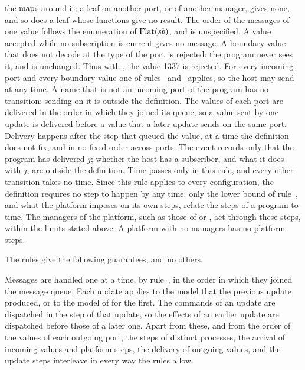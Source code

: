 \begin{rulecomments}
the $\mathrm{map}$s around it; a leaf on another port, or of another manager,
gives none, and so does a leaf whose functions give no result. The order of
the messages of one value follows the enumeration of $\mathrm{Flat}(\mathit{sb})$, and
is unspecified. A value accepted while no subscription is current gives no
message. %
 A boundary value that does not decode at the type of the
port is rejected: the program never sees it, and is unchanged. %
Thus with , the value 1337 is
rejected. For every incoming port and every boundary value one of
rules~ and~ applies, so the host
may send at any time. A name that is not an incoming port of the program has
no transition: sending on it is outside the definition.
 The values of each port are delivered in the order in
which they joined its queue, so a value sent by one update is delivered
before a value that a later update sends on the same port. Delivery happens
after the step that queued the value, at a time the definition does not fix,
and in no fixed order across ports. The event records only that the program
has delivered $j$; whether the host has a subscriber, and what it does with
$j$, are outside the definition. %
 Time passes only in this rule, and every other transition
takes no time. Since this rule applies to every configuration, the definition
requires no step to happen by any time: only the lower bound of
rule~, and what the platform imposes on its own
steps, relate the steps of a program to time.
 The managers of the platform, such as those of
 or , act through these steps, within the limits stated
above. A platform with no managers has no platform steps. %
\end{rulecomments}

The rules give the following guarantees, and no others. %
\begin{property}
Messages are handled one at a time, by rule~, in the
order in which they joined the message queue. Each update applies
 to the model that the previous update produced, or to the model
of  for the first. The commands of an update are dispatched in the
step of that update, so the effects of an earlier update are dispatched
before those of a later one. Apart from these, and from the order of the
values of each outgoing port, the steps of distinct processes, the arrival
of incoming values and platform steps, the delivery of outgoing values, and
the update steps interleave in every way the rules allow.
\end{property}

